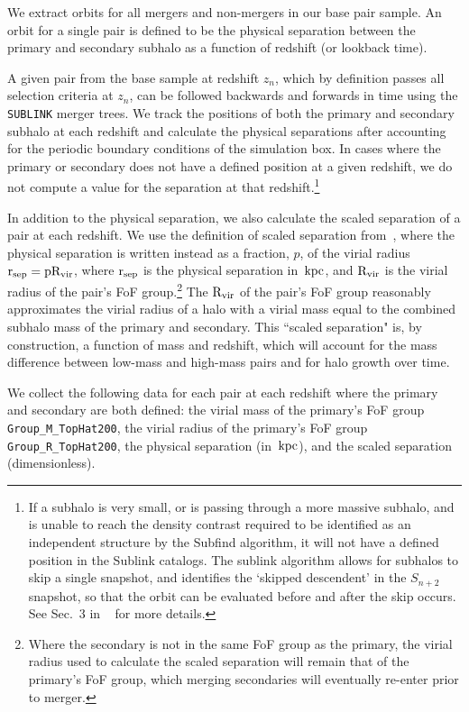 \documentclass[twocolumn,linenumbers]{aastex631}
\newcommand{\Rvir}{\ensuremath{\rm R_{vir}}}
\newcommand{\rsep}{\ensuremath{\rm r_{sep}}}
\begin{document}
We extract orbits for all mergers and non-mergers in our base pair sample. 
An orbit for a single pair is defined to be the physical separation between the primary and secondary subhalo as a function of redshift (or lookback time). 

A given pair from the base sample at redshift $z_n$, which by definition passes all selection criteria at $z_n$, can be followed backwards and forwards in time using the \texttt{SUBLINK} merger trees.  
We track the positions of both the primary and secondary subhalo at each redshift and calculate the physical separations after accounting for the periodic boundary conditions of the simulation box.
In cases where the primary or secondary does not have a defined position at a given redshift, we do not compute a value for the separation at that redshift.\footnote{If a subhalo is very small, or is passing through a more massive subhalo, and is unable to reach the density contrast required to be identified as an independent structure by the Subfind algorithm, it will not have a defined position in the Sublink catalogs. The sublink algorithm allows for subhalos to skip a single snapshot, and identifies the `skipped descendent' in the $S_{n+2}$ snapshot, so that the orbit can be evaluated before and after the skip occurs. See Sec.~3 in ~\citet{RG2015} for more details.}

In addition to the physical separation, we also calculate the scaled separation of a pair at each redshift. We use the definition of scaled separation from~\cite{Chamberlain2024}, where the physical separation is written instead as a fraction, $p$, of the virial radius $\rsep=p\Rvir$, where $\rsep$ is the physical separation in $\mathrm{\,kpc}$, and $\Rvir$ is the virial radius of the pair's FoF group.\footnote{Where the secondary is not in the same FoF group as the primary, the virial radius used to calculate the scaled separation will remain that of the primary's FoF group, which merging secondaries will eventually re-enter prior to merger.} 
The $\Rvir$ of the pair's FoF group reasonably approximates the virial radius of a halo with a virial mass equal to the combined subhalo mass of the primary and secondary.
This ``scaled separation" is, by construction, a function of mass and redshift, which will account for the mass difference between low-mass and high-mass pairs and for halo growth over time. 

We collect the following data for each pair at each redshift where the primary and secondary are both defined: the virial mass of the primary's FoF group \texttt{Group\_M\_TopHat200}, the virial radius of the primary's FoF group \texttt{Group\_R\_TopHat200}, the physical separation (in $\mathrm{\,kpc}$), and the scaled separation (dimensionless).
\end{document}
